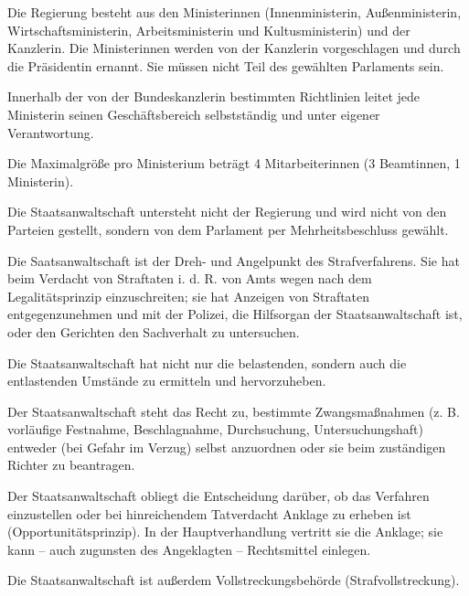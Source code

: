 \documentclass{sasbase}
\begin{document}
\begin{article}[Regierung]
	\item Die Regierung besteht aus den Ministerinnen (Innenministerin, Außenministerin, Wirtschaftsministerin, Arbeitsministerin und Kultusministerin) und der Kanzlerin. Die Ministerinnen werden von der Kanzlerin vorgeschlagen und durch die Präsidentin ernannt. Sie müssen nicht Teil des gewählten Parlaments sein.
	\item Innerhalb der von der Bundeskanzlerin bestimmten Richtlinien leitet jede Ministerin seinen Geschäftsbereich selbstständig und unter eigener Verantwortung.
	\item Die Maximalgröße pro Ministerium beträgt 4 Mitarbeiterinnen (3 Beamtinnen, 1 Ministerin).
\end{article}

\begin{article}[Staatsanwaltschaft]
	\item Die Staatsanwaltschaft untersteht nicht der Regierung und wird nicht von den Parteien gestellt, sondern von dem Parlament per Mehrheitsbeschluss gewählt.
	\item Die Saatsanwaltschaft ist der Dreh- und Angelpunkt des Strafverfahrens. Sie hat beim Verdacht von Straftaten i. d. R. von Amts wegen nach dem Legalitätsprinzip einzuschreiten; sie hat Anzeigen von Straftaten entgegenzunehmen und mit der Polizei, die Hilfsorgan der Staatsanwaltschaft ist, oder den Gerichten den Sachverhalt zu untersuchen.
	\item Die Staatsanwaltschaft hat nicht nur die belastenden, sondern auch die entlastenden Umstände zu ermitteln und hervorzuheben.
	\item Der Staatsanwaltschaft steht das Recht zu, bestimmte Zwangsmaßnahmen (z. B. vorläufige Festnahme, Beschlagnahme, Durchsuchung, Untersuchungshaft) entweder (bei Gefahr im Verzug) selbst anzuordnen oder sie beim zuständigen Richter zu beantragen.
	\item Der Staatsanwaltschaft obliegt die Entscheidung darüber, ob das Verfahren einzustellen oder bei hinreichendem Tatverdacht Anklage zu erheben ist (Opportunitätsprinzip). In der Hauptverhandlung vertritt sie die Anklage; sie kann – auch zugunsten des Angeklagten – Rechtsmittel einlegen.
	\item Die Staatsanwaltschaft ist außerdem Vollstreckungsbehörde (Strafvollstreckung).
\end{article}
\end{document}

